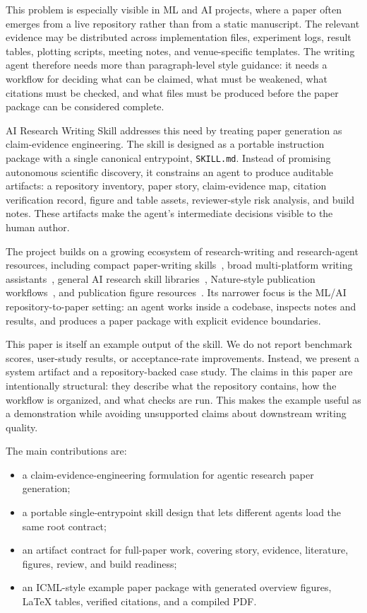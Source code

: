 \documentclass{article}
\begin{document}
This problem is especially visible in ML and AI projects, where a paper often emerges from a live repository rather than from a static manuscript. The relevant evidence may be distributed across implementation files, experiment logs, result tables, plotting scripts, meeting notes, and venue-specific templates. The writing agent therefore needs more than paragraph-level style guidance: it needs a workflow for deciding what can be claimed, what must be weakened, what citations must be checked, and what files must be produced before the paper package can be considered complete.

AI Research Writing Skill addresses this need by treating paper generation as claim-evidence engineering. The skill is designed as a portable instruction package with a single canonical entrypoint, \texttt{SKILL.md}. Instead of promising autonomous scientific discovery, it constrains an agent to produce auditable artifacts: a repository inventory, paper story, claim-evidence map, citation verification record, figure and table assets, reviewer-style risk analysis, and build notes. These artifacts make the agent's intermediate decisions visible to the human author.

The project builds on a growing ecosystem of research-writing and research-agent resources, including compact paper-writing skills~\cite{masterCaiResearchPaperWritingSkills}, broad multi-platform writing assistants~\cite{normanBuryResearchWritingSkill}, general AI research skill libraries~\cite{orchestraResearchAISkills}, Nature-style publication workflows~\cite{yuanNatureSkills}, and publication figure resources~\cite{chenFigures4Papers}. Its narrower focus is the ML/AI repository-to-paper setting: an agent works inside a codebase, inspects notes and results, and produces a paper package with explicit evidence boundaries.

This paper is itself an example output of the skill. We do not report benchmark scores, user-study results, or acceptance-rate improvements. Instead, we present a system artifact and a repository-backed case study. The claims in this paper are intentionally structural: they describe what the repository contains, how the workflow is organized, and what checks are run. This makes the example useful as a demonstration while avoiding unsupported claims about downstream writing quality.

The main contributions are:
\begin{itemize}
  \item a claim-evidence-engineering formulation for agentic research paper generation;
  \item a portable single-entrypoint skill design that lets different agents load the same root contract;
  \item an artifact contract for full-paper work, covering story, evidence, literature, figures, review, and build readiness;
  \item an ICML-style example paper package with generated overview figures, LaTeX tables, verified citations, and a compiled PDF.
\end{itemize}
\end{document}
